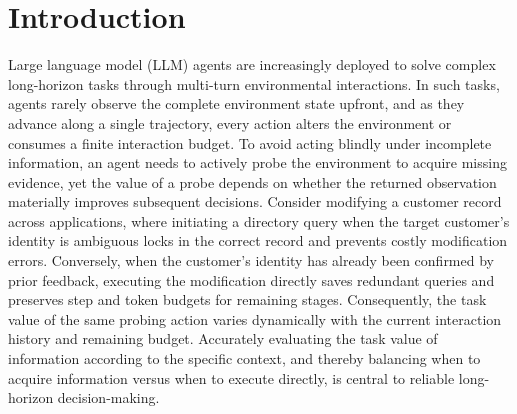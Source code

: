 \documentclass[11pt]{article}
\theoremstyle{definition}
\theoremstyle{remark}
\newcommand{\spar}{\textsc{SPAR}}
\begin{document}
\begin{abstract}
To address the distribution shift induced by active branch sampling, \spar{} recalibrates branch gradients according to the current policy's original mode selection probabilities and constructs a cross-branch baseline, leveraging this aligned probability reweighting mechanism to ensure that policy optimization remains strictly aligned with the test-time execution objective while fully exploiting contrastive signals.
Theoretical analysis proves that this update mechanism remains unbiased with respect to the test-time single-stream execution objective and significantly reduces the estimation variance of mode-selection gradients, ensuring stable long-horizon policy optimization.
Experiments across two long-horizon tool-interaction benchmarks and three open-weight LLM backbones demonstrate that \spar{} significantly outperforms existing RL-based methods and test-time enhancement methods in budget-aware task utility, task success rate, and environmental feedback utilization efficiency.
\end{abstract}

\section{Introduction}
\label{sec:intro}

Large language model (LLM) agents are increasingly deployed to solve complex long-horizon tasks through multi-turn environmental interactions.
In such tasks, agents rarely observe the complete environment state upfront, and as they advance along a single trajectory, every action alters the environment or consumes a finite interaction budget.
To avoid acting blindly under incomplete information, an agent needs to actively probe the environment to acquire missing evidence, yet the value of a probe depends on whether the returned observation materially improves subsequent decisions.
Consider modifying a customer record across applications, where initiating a directory query when the target customer's identity is ambiguous locks in the correct record and prevents costly modification errors.
Conversely, when the customer's identity has already been confirmed by prior feedback, executing the modification directly saves redundant queries and preserves step and token budgets for remaining stages.
Consequently, the task value of the same probing action varies dynamically with the current interaction history and remaining budget.
Accurately evaluating the task value of information according to the specific context, and thereby balancing when to acquire information versus when to execute directly, is central to reliable long-horizon decision-making.
\end{document}
